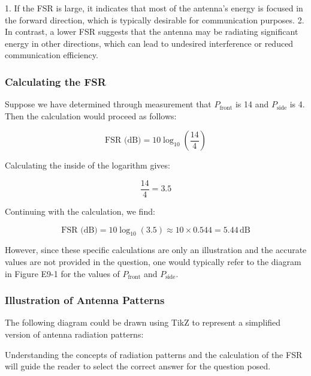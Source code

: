 1. If the FSR is large, it indicates that most of the antenna's energy is focused in the forward direction, which is typically desirable for communication purposes.
2. In contrast, a lower FSR suggests that the antenna may be radiating significant energy in other directions, which can lead to undesired interference or reduced communication efficiency.

\subsubsection{Calculating the FSR}
Suppose we have determined through measurement that \( P_{\text{front}} \) is 14 and \( P_{\text{side}} \) is 4. Then the calculation would proceed as follows:

\[
\text{FSR (dB)} = 10 \log_{10} \left( \frac{14}{4} \right)
\]

Calculating the inside of the logarithm gives:

\[
\frac{14}{4} = 3.5
\]

Continuing with the calculation, we find:

\[
\text{FSR (dB)} = 10 \log_{10}(3.5) \approx 10 \times 0.544 = 5.44 \, \text{dB}
\]

However, since these specific calculations are only an illustration and the accurate values are not provided in the question, one would typically refer to the diagram in Figure E9-1 for the values of \( P_{\text{front}} \) and \( P_{\text{side}} \).

\subsubsection{Illustration of Antenna Patterns}
The following diagram could be drawn using TikZ to represent a simplified version of antenna radiation patterns:

\begin{center}
\end{center}

Understanding the concepts of radiation patterns and the calculation of the FSR will guide the reader to select the correct answer for the question posed.
